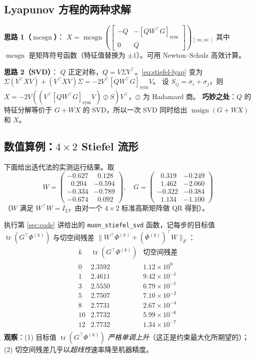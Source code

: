 \documentclass[11pt,a4paper]{article}
\theoremstyle{mythm}
\theoremstyle{mydef}
\newcommand{\tr}{\operatorname{tr}}
\newcommand{\msign}{\operatorname{msign}}
\newcommand{\mcsgn}{\operatorname{mcsgn}}
\begin{document}
\subsection{Lyapunov 方程的两种求解}

\textbf{思路 1（$\mcsgn$）}：
$X = \mcsgn\!\left(\!\begin{bmatrix}-Q & -[QW^\top G]_{\mathrm{sym}}\\ 0 & Q\end{bmatrix}\!\right)\!_{[:m,m:]}$
其中 $\mcsgn$ 是矩阵符号函数（特征值替换为 $\pm 1$）。可用 Newton--Schulz 高效计算。

\textbf{思路 2（SVD）}：
$Q$ 正定对称，$Q = V\Sigma V^\top$。\eqref{eq:stiefel-lyap} 变为
$\Sigma(V^\top XV) + (V^\top XV)\Sigma = -2 V^\top [QW^\top G]_{\mathrm{sym}} V$。
设 $S_{ij}=\sigma_i+\sigma_j$，则
$X = -2 V\!\left( (V^\top [QW^\top G]_{\mathrm{sym}} V) \oslash S \right)\!V^\top$，$\oslash$ 为 Hadamard 商。
\textbf{巧妙之处}：$Q$ 的特征分解等价于 $G+WX$ 的 SVD，所以一次 SVD 同时给出 $\msign(G+WX)$ 和 $X$。

\subsection{数值算例：$4\times 2$ Stiefel 流形}\label{sec:stiefel-numeric}

下面给出迭代法的实测运行结果。取
$$W = \begin{pmatrix}-0.627 & \;\;0.128 \\ \;\;0.204 & -0.594 \\ -0.334 & -0.789 \\ -0.674 & \;\;0.092\end{pmatrix},\quad
G = \begin{pmatrix}\;\;0.319 & -0.249 \\ \;\;1.462 & -2.060 \\ -0.322 & -0.384 \\ \;\;1.134 & -1.100\end{pmatrix}$$
（$W$ 满足 $W^\top W = I_2$，由对一个 $4\times 2$ 标准高斯矩阵做 QR 得到）。

执行第 \ref{sec:code} 讲给出的 \verb|muon_stiefel_svd| 函数，记每步的目标值 $\tr(G^\top \Phi^{(k)})$ 与切空间残差 $\|W^\top\Phi^{(k)}+(\Phi^{(k)})^\top W\|_F$：
$$
\begin{array}{c|cc}
k & \tr(G^\top \Phi^{(k)}) & \text{切空间残差} \\\hline
0  & 2.3592 & 1.12\times 10^{0} \\
1  & 2.4611 & 9.42\times 10^{-1} \\
3  & 2.5550 & 6.79\times 10^{-1} \\
5  & 2.7507 & 7.10\times 10^{-2} \\
8  & 2.7731 & 2.67\times 10^{-4} \\
10 & 2.7732 & 5.99\times 10^{-6} \\
12 & 2.7732 & 1.34\times 10^{-7} \\
\end{array}
$$
\textbf{观察}：(1) 目标值 $\tr(G^\top\Phi^{(k)})$ \emph{严格单调上升}（这正是约束最大化所期望的）；(2) 切空间残差几乎以\emph{超线性}速率降至机器精度。
\end{document}
